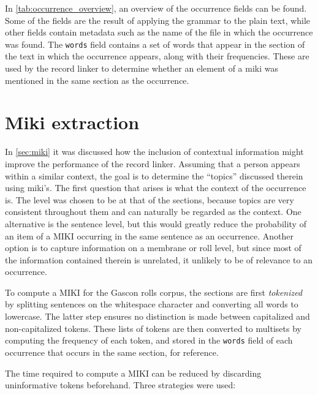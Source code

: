 In \cref{tab:occurrence_overview}, an overview of the occurrence fields can be found.
Some of the fields are the result of applying the grammar to the plain text, while other fields contain metadata such as the name of the file in which the occurrence was found.
The \texttt{words} field contains a set of words that appear in the section of the text in which the occurrence appears, along with their frequencies.
These are used by the record linker to determine whether an element of a miki was mentioned in the same section as the occurrence.




\section{Miki extraction}
\label{sec:miki_evaluation}

In \cref{sec:miki} it was discussed how the inclusion of contextual information might improve the performance of the record linker.
Assuming that a person appears within a similar context, the goal is to determine the ``topics'' discussed therein using miki's.
The first question that arises is what the context of the occurrence is.
The level was chosen to be at that of the sections, because topics are very consistent throughout them and can naturally be regarded as the context.
One alternative is the sentence level, but this would greatly reduce the probability of an item of a MIKI occurring in the same sentence as an occurrence.
Another option is to capture information on a membrane or roll level, but since most of the information contained therein is unrelated, it unlikely to be of relevance to an occurrence.

To compute a MIKI for the Gascon rolls corpus, the sections are first \emph{tokenized} by splitting sentences on the whitespace character and converting all words to lowercase.
The latter step ensures no distinction is made between capitalized and non-capitalized tokens.
These lists of tokens are then converted to multisets by computing the frequency of each token, and stored in the \texttt{words} field of each occurrence that occurs in the same section, for reference.

The time required to compute a MIKI can be reduced by discarding uninformative tokens beforehand.
Three strategies were used:

